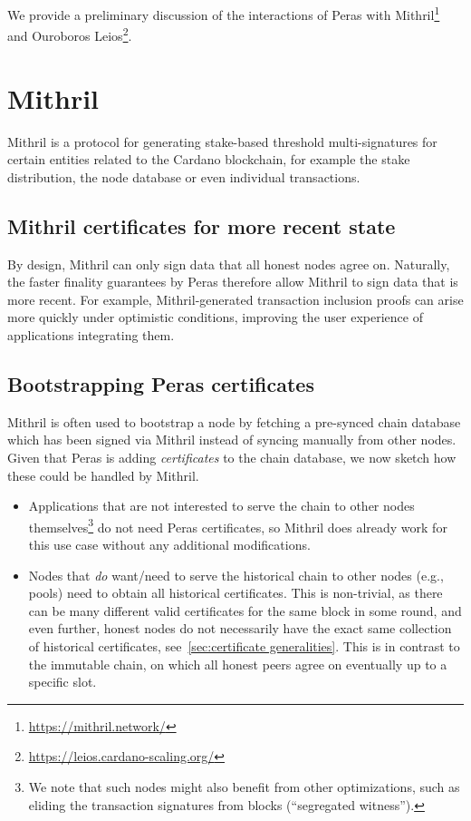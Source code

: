 We provide a preliminary discussion of the interactions of Peras with Mithril\footnote{\label{footnote:mithril}\url{https://mithril.network/}} and Ouroboros Leios\footnote{\label{footnote:leios}\url{https://leios.cardano-scaling.org/}}.

\section{Mithril}\label{sec:mithril}

Mithril is a protocol for generating stake-based threshold multi-signatures for certain entities related to the Cardano blockchain, for example the stake distribution, the node database or even individual transactions.

\subsection{Mithril certificates for more recent state}

By design, Mithril can only sign data that all honest nodes agree on.
Naturally, the faster finality guarantees by Peras therefore allow Mithril to sign data that is more recent.
For example, Mithril-generated transaction inclusion proofs can arise more quickly under optimistic conditions, improving the user experience of applications integrating them.

\subsection{Bootstrapping Peras certificates}
Mithril is often used to bootstrap a node by fetching a pre-synced chain database which has been signed via Mithril instead of syncing manually from other nodes.
Given that Peras is adding \emph{certificates} to the chain database, we now sketch how these could be handled by Mithril.
\begin{itemize}
\item
  Applications that are not interested to serve the chain to other nodes themselves\footnote{
    We note that such nodes might also benefit from other optimizations, such as eliding the transaction signatures from blocks (\enquote{segregated witness}).}
  do not need Peras certificates, so Mithril does already work for this use case without any additional modifications.
\item
  Nodes that \emph{do} want/need to serve the historical chain to other nodes (e.g., pools) need to obtain all historical certificates.
  This is non-trivial, as there can be many different valid certificates for the same block in some round, and even further, honest nodes do not necessarily have the exact same collection of historical certificates, see~\cref{sec:certificate generalities}.
  This is in contrast to the immutable chain, on which all honest peers agree on eventually up to a specific slot.

\end{itemize}

